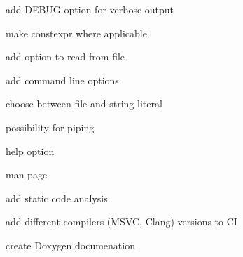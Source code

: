 
\begin{DoxyItemize}
\item add D\+E\+B\+UG option for verbose output
\item make constexpr where applicable
\item add option to read from file
\item add command line options
\begin{DoxyItemize}
\item choose between file and string literal
\item possibility for piping
\item help option
\item man page
\end{DoxyItemize}
\item add static code analysis
\item add different compilers (M\+S\+VC, Clang) versions to CI
\item create Doxygen documenation 
\end{DoxyItemize}
